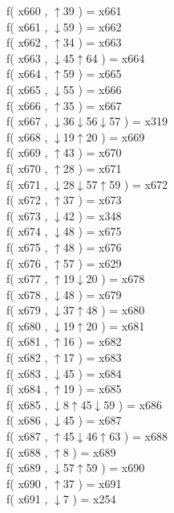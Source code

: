 f( x660 , $\uparrow$39 ) = x661 \\
f( x661 , $\downarrow$59 ) = x662 \\
f( x662 , $\uparrow$34 ) = x663 \\
f( x663 , $\downarrow$45$\uparrow$64 ) = x664 \\
f( x664 , $\uparrow$59 ) = x665 \\
f( x665 , $\downarrow$55 ) = x666 \\
f( x666 , $\uparrow$35 ) = x667 \\
f( x667 , $\downarrow$36$\downarrow$56$\downarrow$57 ) = x319 \\
f( x668 , $\downarrow$19$\uparrow$20 ) = x669 \\
f( x669 , $\uparrow$43 ) = x670 \\
f( x670 , $\uparrow$28 ) = x671 \\
f( x671 , $\downarrow$28$\downarrow$57$\uparrow$59 ) = x672 \\
f( x672 , $\uparrow$37 ) = x673 \\
f( x673 , $\downarrow$42 ) = x348 \\
f( x674 , $\downarrow$48 ) = x675 \\
f( x675 , $\uparrow$48 ) = x676 \\
f( x676 , $\uparrow$57 ) = x629 \\
f( x677 , $\uparrow$19$\downarrow$20 ) = x678 \\
f( x678 , $\downarrow$48 ) = x679 \\
f( x679 , $\downarrow$37$\uparrow$48 ) = x680 \\
f( x680 , $\downarrow$19$\uparrow$20 ) = x681 \\
f( x681 , $\uparrow$16 ) = x682 \\
f( x682 , $\uparrow$17 ) = x683 \\
f( x683 , $\downarrow$45 ) = x684 \\
f( x684 , $\uparrow$19 ) = x685 \\
f( x685 , $\downarrow$8$\uparrow$45$\downarrow$59 ) = x686 \\
f( x686 , $\downarrow$45 ) = x687 \\
f( x687 , $\uparrow$45$\downarrow$46$\uparrow$63 ) = x688 \\
f( x688 , $\uparrow$8 ) = x689 \\
f( x689 , $\downarrow$57$\uparrow$59 ) = x690 \\
f( x690 , $\uparrow$37 ) = x691 \\
f( x691 , $\downarrow$7 ) = x254 \\
